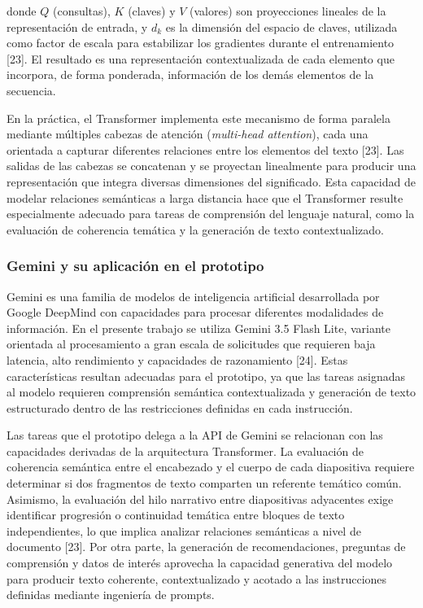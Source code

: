 \documentclass[11pt]{article}
\newif\ifshowttiimarks
\newcommand{\ttiiTOC}[1]{%
  \ifshowttiimarks
    \texorpdfstring{\textcolor{ttiipurple}{\textbf{#1}}}{#1}%
  \else
    #1%
  \fi
}
\begin{document}
donde $Q$ (consultas), $K$ (claves) y $V$ (valores) son proyecciones lineales de la representación de entrada, y $d_k$ es la dimensión del espacio de claves, utilizada como factor de escala para estabilizar los gradientes durante el entrenamiento [23]. El resultado es una representación contextualizada de cada elemento que incorpora, de forma ponderada, información de los demás elementos de la secuencia.

En la práctica, el Transformer implementa este mecanismo de forma paralela mediante múltiples cabezas de atención (\textit{multi-head attention}), cada una orientada a capturar diferentes relaciones entre los elementos del texto [23]. Las salidas de las cabezas se concatenan y se proyectan linealmente para producir una representación que integra diversas dimensiones del significado. Esta capacidad de modelar relaciones semánticas a larga distancia hace que el Transformer resulte especialmente adecuado para tareas de comprensión del lenguaje natural, como la evaluación de coherencia temática y la generación de texto contextualizado.

\subsubsection*{Gemini y su aplicación en el prototipo}
\addcontentsline{toc}{subsubsection}{\protect\ttiiTOC{Gemini y su aplicación en el prototipo}}

Gemini es una familia de modelos de inteligencia artificial desarrollada por Google DeepMind con capacidades para procesar diferentes modalidades de información. En el presente trabajo se utiliza Gemini 3.5 Flash Lite, variante orientada al procesamiento a gran escala de solicitudes que requieren baja latencia, alto rendimiento y capacidades de razonamiento [24]. Estas características resultan adecuadas para el prototipo, ya que las tareas asignadas al modelo requieren comprensión semántica contextualizada y generación de texto estructurado dentro de las restricciones definidas en cada instrucción.

Las tareas que el prototipo delega a la API de Gemini se relacionan con las capacidades derivadas de la arquitectura Transformer. La evaluación de coherencia semántica entre el encabezado y el cuerpo de cada diapositiva requiere determinar si dos fragmentos de texto comparten un referente temático común. Asimismo, la evaluación del hilo narrativo entre diapositivas adyacentes exige identificar progresión o continuidad temática entre bloques de texto independientes, lo que implica analizar relaciones semánticas a nivel de documento [23]. Por otra parte, la generación de recomendaciones, preguntas de comprensión y datos de interés aprovecha la capacidad generativa del modelo para producir texto coherente, contextualizado y acotado a las instrucciones definidas mediante ingeniería de prompts.
\end{document}
